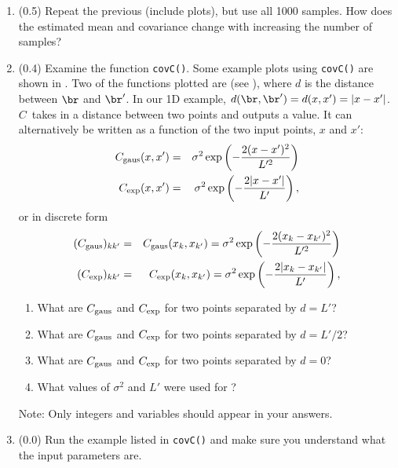 \documentclass[11pt,titlepage,fleqn]{article}
\begin{document}
\begin{enumerate}
\item (0.5) Repeat the previous (include plots), but use all 1000 samples. How does the estimated mean and covariance change with increasing the number of samples?

\label{prob:Cd}


\item (0.4) Examine the function \verb+covC()+.
Some example plots using \verb+covC()+ are shown in . Two of the functions plotted are  (see ), where $d$ is the distance between $\br$ and $\br'$. In our 1D example, $d(\br,\br') = d(x,x') = |x - x'|$.
%
$C$~takes in a distance between two points and outputs a value. It can alternatively be written as a function of the two input points, $x$ and $x'$:
%
\begin{eqnarray}
C_{\rm gaus}(x,x') &=&
\sigma^2 \exp \left( - \frac{2 (x-x')^2}{L'^2} \right) 
\\
C_{\rm exp}(x,x') &=&
\sigma^2 \exp \left( - \frac{2 |x-x'|}{L'} \right)
,
\end{eqnarray}
%
or in discrete form
%
\begin{eqnarray}
(C_{\rm gaus})_{kk'} &=& C_{\rm gaus}(x_k,x_{k'}) =
\sigma^2 \exp \left( - \frac{2 (x_k-x_{k'})^2}{L'^2} \right) 
\\
(C_{\rm exp})_{kk'} &=& C_{\rm exp}(x_k,x_{k'}) =
\sigma^2 \exp \left( - \frac{2 |x_k-x_{k'}|}{L'} \right)
,
\end{eqnarray}

\begin{enumerate}
\item What are $C_{\rm gaus}$ and $C_{\rm exp}$ for two points separated by $d = L'$?
\item What are $C_{\rm gaus}$ and $C_{\rm exp}$ for two points separated by $d = L'/2$?
\item What are $C_{\rm gaus}$ and $C_{\rm exp}$ for two points separated by $d = 0$?
\item What values of $\sigma^2$ and $L'$ were used for ?
\end{enumerate}
%
Note: Only integers and variables should appear in your answers.


\item (0.0) Run the example listed in \verb+covC()+ and make sure you understand what the input parameters are.


\end{enumerate}
\end{document}
